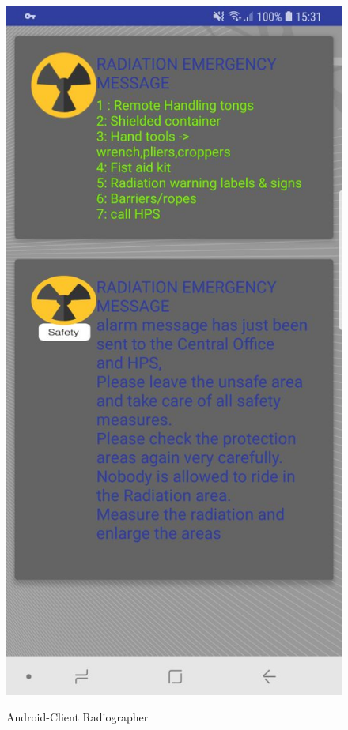 \begin{figure}[htb]
               \includegraphics[scale=0.2]{img/soft/alarm.jpeg}\\
\caption{Android-Client Radiographer}
  \label{sec:rg2} 
\end{figure}
